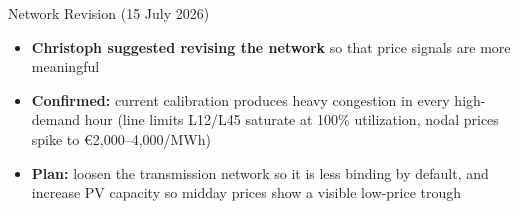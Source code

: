 \documentclass[10pt]{beamer}
\begin{document}
\begin{frame}{Network Revision (15 July 2026)}
\vspace{0.2cm}

\begin{itemize}
    \item \textbf{Christoph suggested revising the network} so that price signals are more meaningful
    \item \textbf{Confirmed:} current calibration produces heavy congestion in every high-demand hour (line limits L12/L45 saturate at 100\% utilization, nodal prices spike to \euro{}2,000--4,000/MWh)
    \item \textbf{Plan:} loosen the transmission network so it is less binding by default, and increase PV capacity so midday prices show a visible low-price trough
\end{itemize}

\end{frame}
\end{document}
